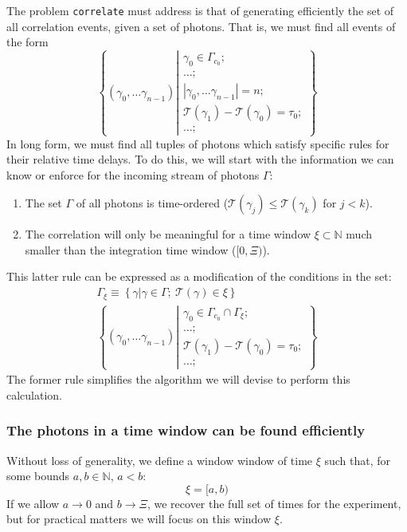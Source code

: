\documentclass{article}
\newcommand{\braces}[1]{\ensuremath{\left\lbrace #1 \right\rbrace}}
\newcommand{\correlate}{\texttt{correlate}}
\newcommand{\wholes}{\ensuremath{\mathbb{N}}}
\newcommand{\abs}[1]{\ensuremath{\left|#1\right|}}
\newcommand{\Time}{\ensuremath{\mathcal{T}}}
\newcommand{\photon}{\ensuremath{\gamma}}
\newcommand{\photons}{\ensuremath{\Gamma}}
\newcommand{\integrationtime}{\ensuremath{\Xi}}
\newcommand{\timewindow}{\ensuremath{\xi}}
\begin{document}
The problem \correlate{} must address is that of generating efficiently the set of all correlation events, given a set of photons. That is, we must find all events of the form
\begin{equation}
\braces{(\photon_{0},\ldots\photon_{n-1})
        \left|
        \begin{aligned}
        \photon_{0}\in\photons_{c_{0}};\\
        \ldots; \\
        \abs{\photon_{0},\ldots\photon_{n-1}}=n;\\
        \Time(\photon_{1})-\Time(\photon_{0})=\tau_{0};\\
        \ldots;
        \end{aligned}
        \right.}
\end{equation}
In long form, we must find all tuples of photons which satisfy specific rules for their relative time delays. To do this, we will start with the information we can know or enforce for the incoming stream of photons \photons:
\begin{enumerate}
\item The set \photons{} of all photons is time-ordered ($\Time(\photon_{j})\le\Time(\photon_{k})$ for $j<k$).
\item The correlation will only be meaningful for a time window $\timewindow\subset\wholes$ much smaller than the integration time window ($[0, \integrationtime)$).
\end{enumerate}
This latter rule can be expressed as a modification of the conditions in the set:
\begin{align}
\photons_{\timewindow}\equiv\braces{\photon\left|\photon\in\photons;~\Time(\photon)\in\timewindow\right.}\\
\braces{(\photon_{0},\ldots\photon_{n-1})
        \left|
        \begin{aligned}
        \photon_{0}\in\photons_{c_{0}}\cap\photons_{\timewindow};\\
        \ldots; \\
        \Time(\photon_{1})-\Time(\photon_{0})=\tau_{0};\\
        \ldots;
        \end{aligned}
        \right.}
\end{align}
The former rule simplifies the algorithm we will devise to perform this calculation.

\subsubsection{The photons in a time window can be found efficiently}
Without loss of generality, we define a window window of time $\timewindow$ such that, for some bounds $a,b\in\wholes$, $a<b$:
\begin{equation}
\timewindow = [a,b)
\end{equation}
If we allow $a\rightarrow0$ and $b\rightarrow\integrationtime$, we recover the full set of times for the experiment, but for practical matters we will focus on this window \timewindow.
\end{document}
